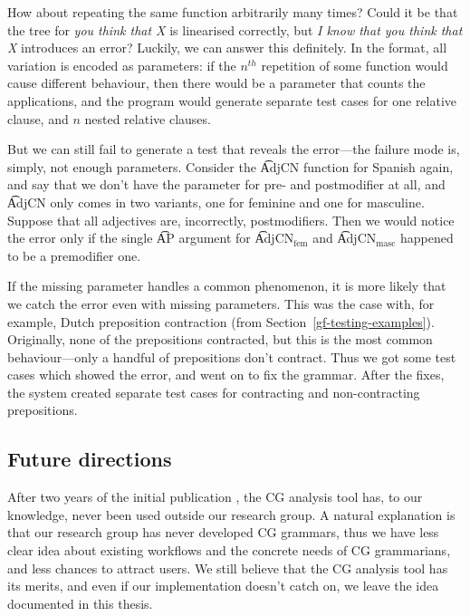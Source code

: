 How about repeating the same function arbitrarily many times? Could it
be that the tree for {\em you think that X} is linearised correctly,
but {\em I know that you think that X} introduces an error?  Luckily,
we can answer this definitely.  In the \pmcfg{} format, all variation
is encoded as parameters: if the $n^{th}$ repetition of some function
would cause different behaviour, then there would be a parameter that
counts the applications, and the program would generate separate test
cases for one relative clause, and $n$ nested relative clauses.

But we can still fail to generate a test that reveals the error---the
failure mode is, simply, not enough parameters.  Consider the
\t{AdjCN} function for Spanish again, and say that we don’t have the
parameter for pre- and postmodifier at all, and \t{AdjCN} only comes
in two variants, one for feminine and one for masculine. Suppose that
all adjectives are, incorrectly, postmodifiers. Then we would notice
the error only if the single \t{AP} argument for \t{AdjCN$_{\text{fem}}$} 
and \t{AdjCN$_{\text{masc}}$} happened to be a premodifier one.

If the missing parameter handles a common phenomenon, it is more
likely that we catch the error even with missing parameters. This was
the case with, for example, Dutch preposition contraction (from
Section~\ref{gf-testing-examples}). Originally, none of the
prepositions contracted, but this is the most common behaviour---only a
handful of prepositions don’t contract. Thus we got some test cases
which showed the error, and went on to fix the grammar. After the
fixes, the system created separate test cases for contracting and
non-contracting prepositions.

\subsection{Future directions}

After two years of the initial publication
\cite{listenmaa_claessen2016}, the CG analysis tool has, to our
knowledge, never been used outside our research group. A natural
explanation is that our research group has never developed CG
grammars, thus we have less clear idea about existing workflows and
the concrete needs of CG grammarians, and less chances to attract
users. %
We still believe that the CG analysis tool has its merits, and
even if our implementation doesn't catch on, we leave the idea
documented in this thesis.


